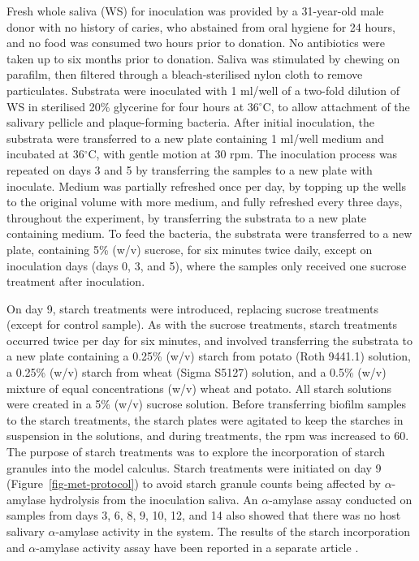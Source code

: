 \documentclass[10pt,a4paper]{article}
\begin{document}
Fresh whole saliva (WS) for inoculation was provided by a 31-year-old
male donor with no history of caries, who abstained from oral hygiene
for 24 hours, and no food was consumed two hours prior to donation. No
antibiotics were taken up to six months prior to donation. Saliva was
stimulated by chewing on parafilm, then filtered through a
bleach-sterilised nylon cloth to remove particulates. Substrata were
inoculated with 1 ml/well of a two-fold dilution of WS in sterilised
20\% glycerine for four hours at 36\(^{\circ}\)C, to allow attachment of
the salivary pellicle and plaque-forming bacteria. After initial
inoculation, the substrata were transferred to a new plate containing 1
ml/well medium and incubated at 36\(^{\circ}\)C, with gentle motion at
30 rpm. The inoculation process was repeated on days 3 and 5 by
transferring the samples to a new plate with inoculate. Medium was
partially refreshed once per day, by topping up the wells to the
original volume with more medium, and fully refreshed every three days,
throughout the experiment, by transferring the substrata to a new plate
containing medium. To feed the bacteria, the substrata were transferred
to a new plate, containing 5\% (w/v) sucrose, for six minutes twice
daily, except on inoculation days (days 0, 3, and 5), where the samples
only received one sucrose treatment after inoculation.

On day 9, starch treatments were introduced, replacing sucrose
treatments (except for control sample). As with the sucrose treatments,
starch treatments occurred twice per day for six minutes, and involved
transferring the substrata to a new plate containing a 0.25\% (w/v)
starch from potato (Roth 9441.1) solution, a 0.25\% (w/v) starch from
wheat (Sigma S5127) solution, and a 0.5\% (w/v) mixture of equal
concentrations (w/v) wheat and potato. All starch solutions were created
in a 5\% (w/v) sucrose solution. Before transferring biofilm samples to
the starch treatments, the starch plates were agitated to keep the
starches in suspension in the solutions, and during treatments, the rpm
was increased to 60. The purpose of starch treatments was to explore the
incorporation of starch granules into the model calculus. Starch
treatments were initiated on day 9 (Figure~\ref{fig-met-protocol}) to
avoid starch granule counts being affected by \(\alpha\)-amylase
hydrolysis from the inoculation saliva. An \(\alpha\)-amylase assay
conducted on samples from days 3, 6, 8, 9, 10, 12, and 14 also showed
that there was no host salivary \(\alpha\)-amylase activity in the
system. The results of the starch incorporation and \(\alpha\)-amylase
activity assay have been reported in a separate article
\citep{bartholdyInvestigatingBiases2022}.
\end{document}
